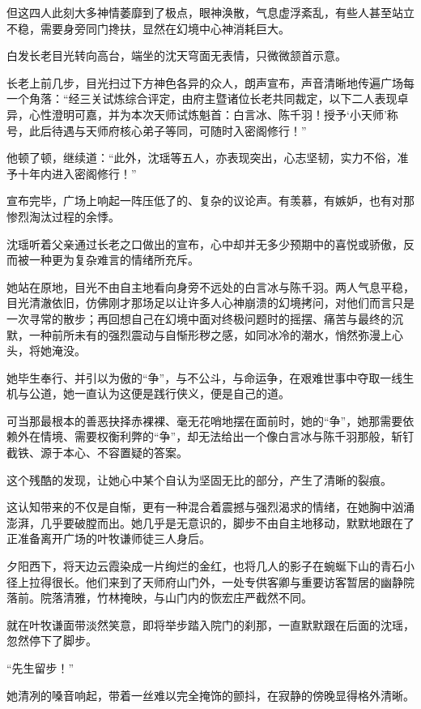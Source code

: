 但这四人此刻大多神情萎靡到了极点，眼神涣散，气息虚浮紊乱，有些人甚至站立不稳，需要身旁同门搀扶，显然在幻境中心神消耗巨大。

白发长老目光转向高台，端坐的沈天穹面无表情，只微微颔首示意。

长老上前几步，目光扫过下方神色各异的众人，朗声宣布，声音清晰地传遍广场每一个角落：“经三关试炼综合评定，由府主暨诸位长老共同裁定，以下二人表现卓异，心性澄明可嘉，并为本次天师试炼魁首：白言冰、陈千羽！授予‘小天师’称号，此后待遇与天师府核心弟子等同，可随时入密阁修行！”

他顿了顿，继续道：“此外，沈瑶等五人，亦表现突出，心志坚韧，实力不俗，准予十年内进入密阁修行！”

宣布完毕，广场上响起一阵压低了的、复杂的议论声。有羡慕，有嫉妒，也有对那惨烈淘汰过程的余悸。

\vspace{2em}

沈瑶听着父亲通过长老之口做出的宣布，心中却并无多少预期中的喜悦或骄傲，反而被一种更为复杂难言的情绪所充斥。

她站在原地，目光不由自主地看向身旁不远处的白言冰与陈千羽。两人气息平稳，目光清澈依旧，仿佛刚才那场足以让许多人心神崩溃的幻境拷问，对他们而言只是一次寻常的散步；再回想自己在幻境中面对终极问题时的摇摆、痛苦与最终的沉默，一种前所未有的强烈震动与自惭形秽之感，如同冰冷的潮水，悄然弥漫上心头，将她淹没。

她毕生奉行、并引以为傲的“争”，与不公斗，与命运争，在艰难世事中夺取一线生机与公道，她一直认为这便是践行侠义，便是自己的道。

可当那最根本的善恶抉择赤裸裸、毫无花哨地摆在面前时，她的“争”，她那需要依赖外在情境、需要权衡利弊的“争”，却无法给出一个像白言冰与陈千羽那般，斩钉截铁、源于本心、不容置疑的答案。

这个残酷的发现，让她心中某个自认为坚固无比的部分，产生了清晰的裂痕。

这认知带来的不仅是自惭，更有一种混合着震撼与强烈渴求的情绪，在她胸中汹涌澎湃，几乎要破膛而出。她几乎是无意识的，脚步不由自主地移动，默默地跟在了正准备离开广场的叶牧谦师徒三人身后。

夕阳西下，将天边云霞染成一片绚烂的金红，也将几人的影子在蜿蜒下山的青石小径上拉得很长。他们来到了天师府山门外，一处专供客卿与重要访客暂居的幽静院落前。院落清雅，竹林掩映，与山门内的恢宏庄严截然不同。

就在叶牧谦面带淡然笑意，即将举步踏入院门的刹那，一直默默跟在后面的沈瑶，忽然停下了脚步。

“先生留步！”

她清冽的嗓音响起，带着一丝难以完全掩饰的颤抖，在寂静的傍晚显得格外清晰。

